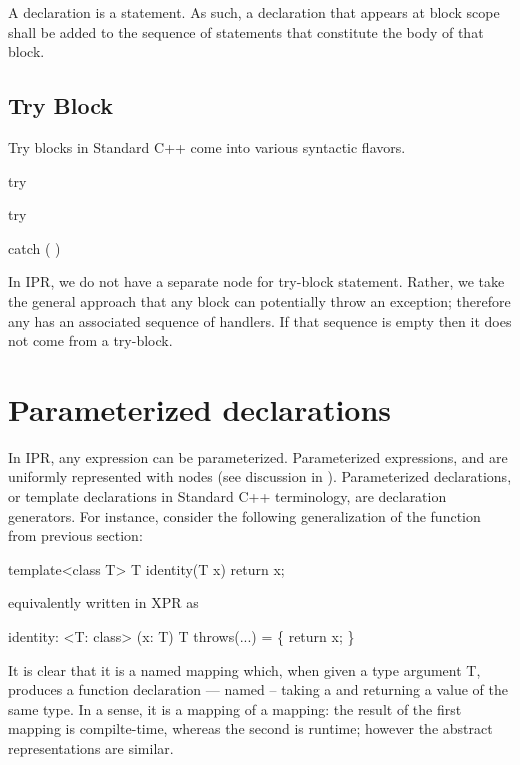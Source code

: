 \documentclass[a4paper,12pt]{article}
\begin{document}
A declaration is a statement.  As such, a declaration that appears at block
scope shall be added to the sequence of statements that constitute the body of
that block.  

\subsection{Try Block}
\label{sec:stmt.try-block}
Try blocks in Standard C++ come into various syntactic flavors.
\begin{Grammar}
     try  

     try   

      

     catch (  ) 
\end{Grammar}

In IPR, we do not have a separate node for try-block statement.  Rather, we
take the general approach that any block can potentially throw an exception;
therefore any  has an associated sequence of handlers.
If that sequence is empty then it does not come from a try-block.  


\section{Parameterized declarations}
\label{sec:decls:parameterized}

In IPR, any expression can be parameterized.  Parameterized expressions, and
are uniformly represented with  nodes (see discussion
in ).  Parameterized declarations, or template
declarations in Standard C++ terminology, are declaration generators. 
For instance, consider the following generalization of the function
 from previous section:
\begin{Program}
  template<class T>
    T identity(T x) 
    { return x; }
\end{Program}
equivalently written in XPR as
\begin{Program}
  identity: <T: class> (x: T) T throws(...) = \{
     return x;
  \}
\end{Program}
It is clear that it is a named mapping which, when given a type argument
T, produces a function declaration --- named  -- taking a
 and returning a value of the same type.  In a sense, it is a mapping
of a mapping: the result of the first mapping is compilte-time, whereas the
second is runtime; however the abstract representations are similar.
\end{document}
